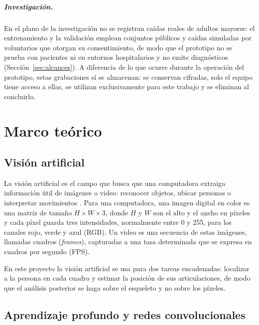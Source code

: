 \documentclass[12pt,a4paper,oneside]{book}
\theoremstyle{plain}
\theoremstyle{definition}
\theoremstyle{remark}
\begin{document}
\paragraph{Investigación.} En el plano de la investigación no se registran caídas reales de adultos mayores: el entrenamiento y la validación emplean conjuntos públicos y caídas simuladas por voluntarios que otorgan su consentimiento, de modo que el prototipo no se prueba con pacientes ni en entornos hospitalarios y no emite diagnósticos (Sección~\ref{sec:alcances}). A diferencia de lo que ocurre durante la operación del prototipo, estas grabaciones sí se almacenan: se conservan cifradas, solo el equipo tiene acceso a ellas, se utilizan exclusivamente para este trabajo y se eliminan al concluirlo.

\chapter{Marco teórico}
\label{cap:marco}

\section{Visión artificial}
\label{sec:vision-artificial}

La visión artificial es el campo que busca que una computadora extraiga información útil de imágenes o video: reconocer objetos, ubicar personas o interpretar movimientos \parencite{szeliski2022computer}. Para una computadora, una imagen digital en color es una matriz de tamaño $H \times W \times 3$, donde $H$ y $W$ son el alto y el ancho en píxeles y cada píxel guarda tres intensidades, normalmente entre 0 y 255, para los canales rojo, verde y azul (RGB). Un video es una secuencia de estas imágenes, llamadas cuadros (\textit{frames}), capturadas a una tasa determinada que se expresa en cuadros por segundo (FPS).

En este proyecto la visión artificial se usa para dos tareas encadenadas: localizar a la persona en cada cuadro y estimar la posición de sus articulaciones, de modo que el análisis posterior se haga sobre el esqueleto y no sobre los píxeles.

\section{Aprendizaje profundo y redes convolucionales}
\label{sec:cnn}
\end{document}
